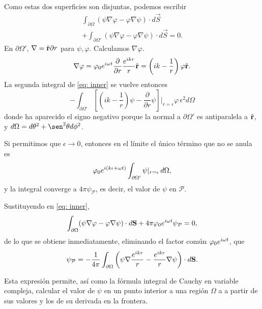 \begin{multicols}{2}
Como estas dos superficies son disjuntas, podemos escribir
\begin{multline}\label{eq: inner}
	\int_{\partial \Omega} (\psi \nabla \varphi - \varphi \nabla \psi) \cdot d\vec S \\
	+  \int_{\partial \Omega'} (\psi \nabla \varphi - \varphi \nabla \psi) \cdot d\vec S= 0.
\end{multline}
En $\partial \Omega'$, $\nabla = \hat{\mathbf{r}} \partial r$ para $\psi, \varphi$. Calculamos $\nabla \varphi$.
\begin{equation}\label{eq: gradi}
	\nabla \varphi =  \varphi_0 e^{i\omega t}\frac{\partial}{\partial r}\frac{e^{ikr}}{r} \hat{\mathbf{r}}
	= \left(ik - \frac{1}{r} \right)\varphi \hat{\mathbf{r}}.
\end{equation}
La segunda integral de \eqref{eq: inner} se vuelve entonces
\begin{equation}
	 -\int_{\partial \Omega'} \left[\left(ik - \frac{1}{r} \right)\psi - \frac{\partial}{\partial r}\psi \right] \biggr\rvert_{r = \epsilon} \varphi \, \epsilon^2 d\Omega
\end{equation}
donde ha aparecido el signo negativo porque la normal a $\partial \Omega'$ es antiparalela a $\hat{\mathbf{r}}$, y $d\Omega = d\theta^2 + \sen^2\theta d\phi^2$.

Si permitimos que $\epsilon \to 0$, entonces en el límite el único término que no se anula es
\begin{equation}
	\varphi_0 e^{i(k\epsilon + \omega t)} \int_{\partial \Omega'} \psi \rvert_{r = \epsilon} \, d\Omega,
\end{equation}
y la integral converge a $4\pi \psi_{\mathcal P}$, es decir, el valor de $\psi$ en $\mathcal P$.

Sustituyendo en \eqref{eq: inner},
\begin{equation}
	\int_{\partial \Omega} (\psi \nabla \varphi - \varphi \nabla \psi) \cdot d\mathbf S + 4\pi \varphi_0 e^{i\omega t}\psi_{\mathcal P} = 0,
\end{equation}
de lo que se obtiene inmediatamente, eliminando el factor común $\varphi_0 e^{i\omega t}$, que
\begin{equation}\label{eq: kirchoff}
	\psi_{\mathcal P} = -\frac{1}{4\pi} \int_{\partial \Omega} \left (\psi \nabla \frac{e^{ikr}}{r} - \frac{e^{ikr}}{r}  \nabla \psi \right ) \cdot d\mathbf S.
\end{equation}

Esta expresión permite, así como la fórmula integral de Cauchy en variable compleja, calcular el valor de $\psi$ en un punto interior a una región $\Omega$ a a partir de sus valores y los de su derivada en la frontera.


\end{multicols}
